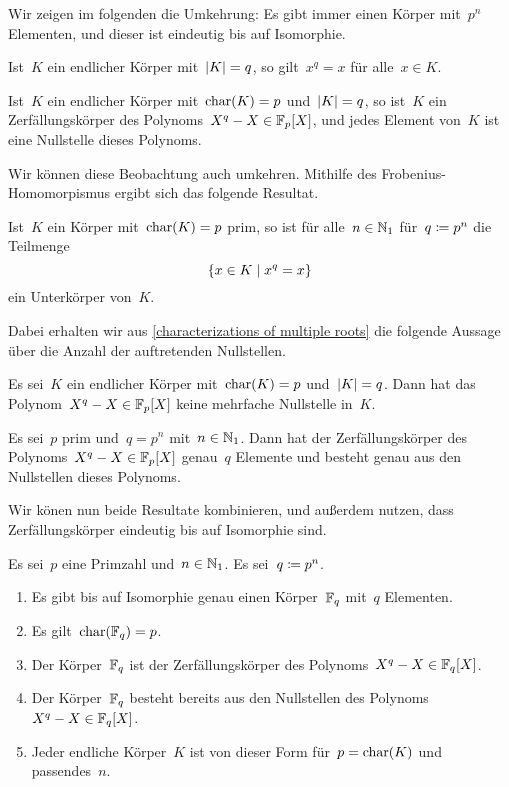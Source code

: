 Wir zeigen im folgenden die Umkehrung:
Es gibt immer einen Körper mit~$p^n$ Elementen, und dieser ist eindeutig bis auf Isomorphie.

\begin{lemma}
  \label{trick lemma for finite fields}
  Ist~$K$ ein endlicher Körper mit~$\lvert K\rvert = q$, so gilt~$x^q = x$ für alle~$x \in K$.
\end{lemma}

\begin{proposition}
  Ist~$K$ ein endlicher Körper mit~$\operatorname{char}(K) = p$ und~$\lvert K\rvert = q$, so ist~$K$ ein Zerfällungskörper des Polynoms~$X^q - X \in \mathbb{F}_p[X]$, und jedes Element von~$K$ ist eine Nullstelle dieses Polynoms.
\end{proposition}

Wir können diese Beobachtung auch umkehren.
Mithilfe des Frobenius-Homomorpismus ergibt sich das folgende Resultat.

\begin{lemma}
  Ist~$K$ ein Körper mit~$\operatorname{char}(K) = p$ prim, so ist für alle~$n \in \mathbb{N}_1$ für~$q \coloneqq p^n$ die Teilmenge
  \[
    \{
      x \in K
    \suchthat
      x^q = x
    \}
  \]
  ein Unterkörper von~$K$.
\end{lemma}

Dabei erhalten wir aus \cref{characterizations of multiple roots} die folgende Aussage über die Anzahl der auftretenden Nullstellen.

\begin{lemma}
  Es sei~$K$ ein endlicher Körper mit~$\operatorname{char}(K) = p$ und~$\lvert K\rvert = q$.
  Dann hat das Polynom~$X^q - X \in \mathbb{F}_p[X]$ keine mehrfache Nullstelle in~$K$.
\end{lemma}

\begin{proposition}
  Es sei~$p$ prim und~$q = p^n$ mit~$n \in \mathbb{N}_1$.
  Dann hat der Zerfällungskörper des Polynoms~$X^q - X \in \mathbb{F}_p[X]$ genau~$q$ Elemente und besteht genau aus den Nullstellen dieses Polynoms.
\end{proposition}

Wir könen nun beide Resultate kombinieren, und außerdem nutzen, dass Zerfällungskörper eindeutig bis auf Isomorphie sind.

\begin{theorem}
  Es sei~$p$ eine Primzahl und~$n \in \mathbb{N}_1$.
  Es sei~$q \coloneqq p^n$.
  \begin{enumerate}
    \item
      Es gibt bis auf Isomorphie genau einen Körper~$\mathbb{F}_q$ mit~$q$ Elementen.
    \item
      Es gilt~$\operatorname{char}(\mathbb{F}_q) = p$.
    \item
      Der Körper~$\mathbb{F}_q$ ist der Zerfällungskörper des Polynoms~$X^q - X \in \mathbb{F}_q[X]$.
    \item
      Der Körper~$\mathbb{F}_q$ besteht bereits aus den Nullstellen des Polynoms~$X^q - X \in \mathbb{F}_q[X]$.
    \item
      Jeder endliche Körper~$K$ ist von dieser Form für~$p = \operatorname{char}(K)$ und passendes~$n$.
  \end{enumerate}
\end{theorem}

